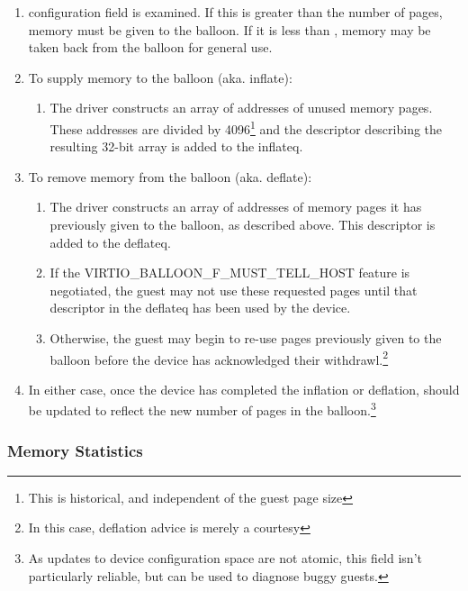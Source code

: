 \begin{enumerate}
\item {} configuration field is examined. If this is
  greater than the  number of pages, memory must be given
  to the balloon. If it is less than ,
  memory may be taken back from the balloon for general
  use.

\item To supply memory to the balloon (aka. inflate):
  \begin{enumerate}
  \item The driver constructs an array of addresses of unused memory
    pages. These addresses are divided by 4096\footnote{This is historical, and independent of the guest page size
} and the descriptor
    describing the resulting 32-bit array is added to the inflateq.
  \end{enumerate}

\item To remove memory from the balloon (aka. deflate):
  \begin{enumerate}
  \item The driver constructs an array of addresses of memory pages
    it has previously given to the balloon, as described above.
    This descriptor is added to the deflateq.

  \item If the VIRTIO_BALLOON_F_MUST_TELL_HOST feature is negotiated, the
    guest may not use these requested pages until that descriptor
    in the deflateq has been used by the device.

  \item Otherwise, the guest may begin to re-use pages previously
    given to the balloon before the device has acknowledged their
    withdrawl.\footnote{In this case, deflation advice is merely a courtesy
}
  \end{enumerate}

\item In either case, once the device has completed the inflation or
  deflation,  should be
  updated to reflect the new number of pages in the balloon.\footnote{As updates to device configuration space are not atomic, this field
isn't particularly reliable, but can be used to diagnose buggy guests.
}
\end{enumerate}

\subsubsection{Memory Statistics}\label{sec:Device Types / Memory Balloon Device / Device Operation / Memory Statistics}

